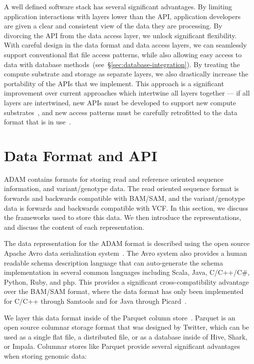 \documentclass[10pt,twocolumn]{article}
\begin{document}
A well defined software stack has several significant advantages. By limiting application interactions with layers lower than the API,
application developers are given a clear and consistent view of the data they are processing. By divorcing the API from the data
access layer, we unlock significant flexibility. With careful design in the data format and data access layers, we can seamlessly
support conventional flat file access patterns, while also allowing easy access to data with database
methods~(see~\S\ref{sec:database-integration}). By treating the compute substrate and storage as separate layers, we also
drastically increase the portability of the APIs that we implement. This approach is a significant improvement over current approaches
which intertwine all layers together --- if all layers are intertwined, new APIs must be developed to support new compute
substrates~\cite{niemenmaa12}, and new access patterns must be carefully retrofitted to the data format that is in use~\cite{kozanitis13}.

\section{Data Format and API}
\label{sec:data-format-and-api}

ADAM contains formats for storing read and reference oriented sequence information, and variant/genotype data.
The read oriented sequence format is forwards and backwards compatible with BAM/SAM, and the variant/genotype
data is forwards and backwards compatible with VCF. In this section, we discuss the frameworks used to store this
data. We then introduce the representations, and discuss the content of each representation.

The data representation for the ADAM format is described using the open source Apache Avro data serialization
system~\cite{avro}. The Avro system also provides a human readable schema description language that can
auto-generate the schema implementation in several common languages including Scala, Java, C/C++/C\#,
Python, Ruby, and php. This provides a significant cross-compatibility advantage over the BAM/SAM format,
where the data format has only been implemented for C/C++ through Samtools and for Java through
Picard~\cite{li09,picard}.

We layer this data format inside of the Parquet column store~\cite{parquet}. Parquet is an open source columnar storage
format that was designed by Twitter, which can be used as a single flat file, a distributed file, or as a database inside of
Hive, Shark, or Impala. Columnar stores like Parquet provide several significant advantages when storing genomic data:
\end{document}

